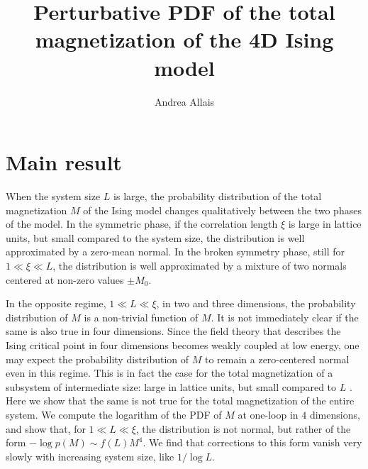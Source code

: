 \documentclass[11pt,a4paper]{article}
\title{Perturbative PDF of the total magnetization of the 4D Ising model }
\author[a]{Andrea Allais}
\affiliation[a]{Independent scholar}
\begin{document}
\maketitle

\section{Main result}

When the system size $L$ is large, the probability distribution of the total
magnetization $M$ of the Ising model changes qualitatively between the two
phases of the model. In the symmetric phase, if the correlation
length $\xi$ is large in lattice units, but small compared to the system size,
the distribution is well approximated by a zero-mean normal.  In the broken
symmetry phase, still for $1 \ll \xi \ll L$, the distribution is well
approximated by a mixture of two normals centered at non-zero values $\pm
M_0$.

In the opposite regime, $1 \ll L \ll \xi$, in two and three dimensions, the
probability distribution of $M$ is a non-trivial function of $M$.  It is not
immediately clear if the same is also true in four dimensions. Since the field
theory that describes the Ising critical point in four dimensions becomes
weakly coupled at low energy, one may expect the probability distribution of
$M$ to remain a zero-centered normal even in this regime. This is in fact the
case for the total magnetization of a subsystem of intermediate size: large in
lattice units, but small compared to $L$ \cite{Binder1981}. Here we show that
the same is not true for the total magnetization of the entire system. We
compute the logarithm of the PDF of $M$ at one-loop in $4$ dimensions, and show
that, for $1 \ll L \ll \xi$, the distribution is not normal, but rather of the
form $-\log p(M)\sim f(L) M^4$.  We find that corrections to this form vanish
very slowly with increasing system size, like $1/\log L$.
\end{document}

